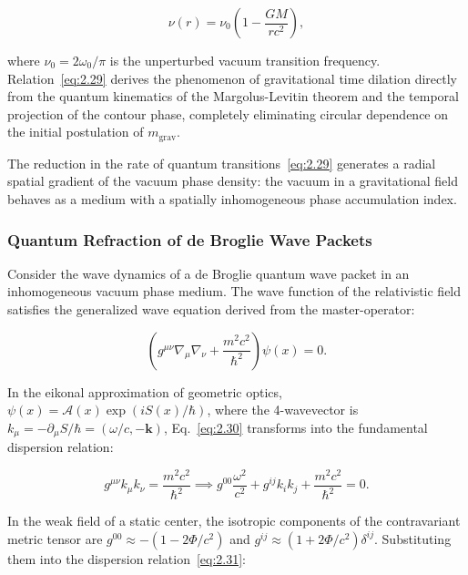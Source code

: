 \begin{equation}\label{eq:2.29}\label{eq:2.79}\tag{2.29}
\nu(r) = \nu_0 \left( 1 - \frac{GM}{r c^2} \right),
\end{equation}

where $\nu_0 = 2 \omega_0 / \pi$ is the unperturbed vacuum transition frequency. Relation~\eqref{eq:2.29} derives the phenomenon of gravitational time dilation directly from the quantum kinematics of the Margolus-Levitin theorem and the temporal projection of the contour phase, completely eliminating circular dependence on the initial postulation of $m_{\text{grav}}$.

The reduction in the rate of quantum transitions~\eqref{eq:2.29} generates a radial spatial gradient of the vacuum phase density: the vacuum in a gravitational field behaves as a medium with a spatially inhomogeneous phase accumulation index.

\subsubsection{Quantum Refraction of de Broglie Wave Packets}\label{sec:2.4.2}

Consider the wave dynamics of a de Broglie quantum wave packet in an inhomogeneous vacuum phase medium. The wave function of the relativistic field satisfies the generalized wave equation derived from the master-operator:

\begin{equation}\label{eq:2.30}\label{eq:2.80}\tag{2.30}
\left( g^{\mu\nu}\nabla_\mu \nabla_\nu + \frac{m^2 c^2}{\hbar^2} \right) \psi(x) = 0.
\end{equation}

In the eikonal approximation of geometric optics, $\psi(x) = \mathcal{A}(x) \exp(i S(x)/\hbar)$, where the 4-wavevector is $k_\mu = -\partial_\mu S / \hbar = (\omega/c, -\mathbf{k})$, Eq.~\eqref{eq:2.30} transforms into the fundamental dispersion relation:

\begin{equation}\label{eq:2.31}\label{eq:2.81}\tag{2.31}
g^{\mu\nu} k_\mu k_\nu = \frac{m^2 c^2}{\hbar^2} \implies g^{00} \frac{\omega^2}{c^2} + g^{ij} k_i k_j + \frac{m^2 c^2}{\hbar^2} = 0.
\end{equation}

In the weak field of a static center, the isotropic components of the contravariant metric tensor are $g^{00} \approx -(1 - 2\Phi/c^2)$ and $g^{ij} \approx (1 + 2\Phi/c^2)\delta^{ij}$. Substituting them into the dispersion relation~\eqref{eq:2.31}:

